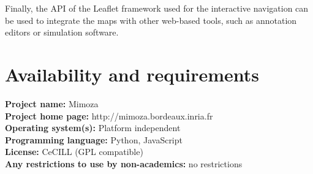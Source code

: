 \documentclass{bmcart}
\begin{document}

Finally, the API of the Leaflet framework used for the interactive navigation can be used to integrate the maps with other web-based tools, such as annotation editors or simulation software.




\section*{Availability and requirements}
\textbf{Project name:} Mimoza\\
\textbf{Project home page:} http://mimoza.bordeaux.inria.fr\\
\textbf{Operating system(s):} Platform independent\\
\textbf{Programming language:} Python, JavaScript\\
\textbf{License:} CeCILL (GPL compatible)\\
\textbf{Any restrictions to use by non-academics:} no restrictions

\end{document}
